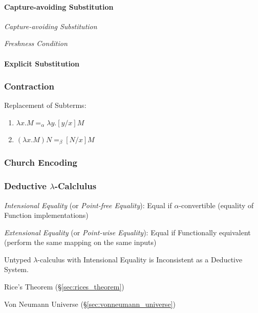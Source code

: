 \paragraph{Capture-avoiding Substitution}\label{sec:capture_avoiding}\hfill

\emph{Capture-avoiding Substitution}

\emph{Freshness Condition}



\paragraph{Explicit Substitution}\label{sec:explicit_substitution}\hfill



\subsubsection{Contraction}\label{sec:contraction}\cite{seldin03}

Replacement of Subterms:
\begin{enumerate}
  \item $\lambda x . M =_\alpha \lambda y . [y/x]M$
  \item $(\lambda x . M)N =_\beta [N/x]M$
\end{enumerate}



\subsubsection{Church Encoding}\label{sec:church_encoding}

\subsubsection{Deductive $\lambda$-Calclulus}\label{sec:deductive_lambda}

\emph{Intensional Equality} (or \emph{Point-free Equality}): Equal if
$\alpha$-convertible (equality of Function implementations)

\emph{Extensional Equality} (or \emph{Point-wise Equality}): Equal if
Functionally equivalent (perform the same mapping on the same inputs)

Untyped $\lambda$-calculus with Intensional Equality is Inconsistent
as a Deductive System.

Rice's Theorem (\S\ref{sec:rices_theorem})

Von Neumann Universe (\S\ref{sec:vonneumann_universe})



